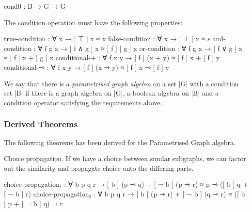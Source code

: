 \begin{code}
cond0 : B → G → G
\end{code}

The condition operation must have the following properties:


\begin{code}
  true-condition : ∀ x → [ ⊤ ] x ≈ x
  false-condition : ∀ x → [ ⊥ ] x ≈ ε
  and-condition : ∀ f g x → [ f ∧ g ] x ≈ [ f ] [ g ]  x
  or-condition : ∀ f g x → [ f ∨ g ] x ≈ [ f ] x + [ g ]  x
  conditional-+ : ∀ f x y → [ f ] (x + y) ≈ [ f ] x + [ f ] y
  conditional-⇾ : ∀ f x y → [ f ] (x ⇾ y) ≈ [ f ] x ⇾ [ f ] y
\end{code}

We say that there is a \emph{parametrised graph algebra} on a set |G| with a condition set |B|
if there is a graph algebra on |G|, a boolean algebra on |B| and a condition operator satisfying the requirements above.

\subsubsection{Derived Theorems}

The following theorems has been derived for the Parametrised Graph algebra.


Choice propagation. If we have a choice between similar subgraphs, we can factor out the similarity and propagate choice onto the differing parts.
\begin{code}
choice-propagation₁ : ∀ b p q r → 
    [ b ] (p ⇾ q) + [ ¬ b ] (p ⇾ r) ≈ p ⇾ ([ b ] q + [ ¬ b ] r) 
choice-propagation₂ : ∀ b p q r → 
    [ b ] (p ⇾ r) + [ ¬ b ] (q ⇾ r) ≈ ([ b ] p + [ ¬ b ] q) ⇾ r
\end{code}


